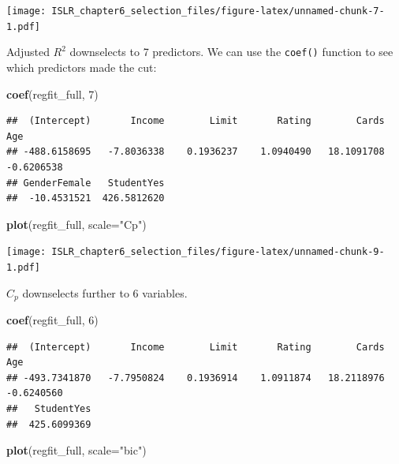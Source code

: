 \documentclass[
]{article}
\newenvironment{Shaded}{\begin{snugshade}}{\end{snugshade}}
\newcommand{\DataTypeTok}[1]{\textcolor[rgb]{0.13,0.29,0.53}{#1}}
\newcommand{\DecValTok}[1]{\textcolor[rgb]{0.00,0.00,0.81}{#1}}
\newcommand{\KeywordTok}[1]{\textcolor[rgb]{0.13,0.29,0.53}{\textbf{#1}}}
\newcommand{\NormalTok}[1]{#1}
\newcommand{\StringTok}[1]{\textcolor[rgb]{0.31,0.60,0.02}{#1}}
\begin{document}
\texttt{[image: ISLR\_chapter6\_selection\_files/figure-latex/unnamed-chunk-7-1.pdf]}

Adjusted \(R^2\) downselects to 7 predictors. We can use the
\texttt{coef()} function to see which predictors made the cut:

\begin{Shaded}
\begin{Highlighting}[]
\KeywordTok{coef}\NormalTok{(regfit_full, }\DecValTok{7}\NormalTok{)}
\end{Highlighting}
\end{Shaded}

\begin{verbatim}
##  (Intercept)       Income        Limit       Rating        Cards          Age 
## -488.6158695   -7.8036338    0.1936237    1.0940490   18.1091708   -0.6206538 
## GenderFemale   StudentYes 
##  -10.4531521  426.5812620
\end{verbatim}

\begin{Shaded}
\begin{Highlighting}[]
\KeywordTok{plot}\NormalTok{(regfit_full, }\DataTypeTok{scale=}\StringTok{"Cp"}\NormalTok{)}
\end{Highlighting}
\end{Shaded}

\texttt{[image: ISLR\_chapter6\_selection\_files/figure-latex/unnamed-chunk-9-1.pdf]}

\(C_p\) downselects further to 6 variables.

\begin{Shaded}
\begin{Highlighting}[]
\KeywordTok{coef}\NormalTok{(regfit_full, }\DecValTok{6}\NormalTok{)}
\end{Highlighting}
\end{Shaded}

\begin{verbatim}
##  (Intercept)       Income        Limit       Rating        Cards          Age 
## -493.7341870   -7.7950824    0.1936914    1.0911874   18.2118976   -0.6240560 
##   StudentYes 
##  425.6099369
\end{verbatim}

\begin{Shaded}
\begin{Highlighting}[]
\KeywordTok{plot}\NormalTok{(regfit_full, }\DataTypeTok{scale=}\StringTok{"bic"}\NormalTok{)}
\end{Highlighting}
\end{Shaded}
\end{document}
